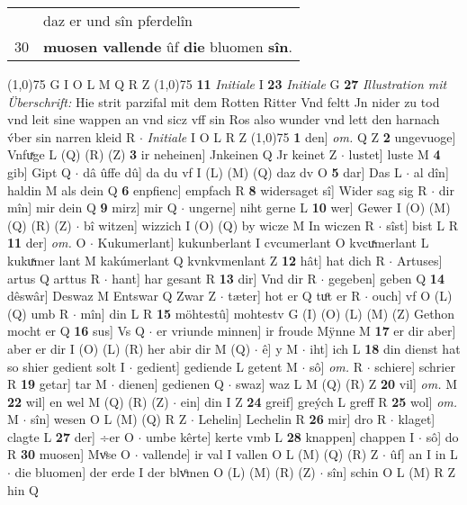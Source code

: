 \documentclass[8pt,a4paper,notitlepage]{article}
\begin{document}
\begin{table}[ht]
\begin{minipage}[t]{0.5\linewidth}
\begin{tabular}{rl}
 & daz er und sîn pferdelîn\\ 
30 & \textbf{muosen vallende} ûf \textbf{die} bluomen \textbf{sîn}.\\ 
\end{tabular}
\scriptsize
\line(1,0){75} \newline
G I O L M Q R Z \newline
\line(1,0){75} \newline
\textbf{11} \textit{Initiale} I  \textbf{23} \textit{Initiale} G  \textbf{27} \textit{Illustration mit Überschrift:} Hie strit parzifal mit dem Rotten Ritter Vnd feltt Jn nider zu tod vnd leit sine wappen an vnd sicz vff sin Ros also wunder vnd lett den harnach v́ber sin narren kleid R   $\cdot$ \textit{Initiale} I O L R Z  \newline
\line(1,0){75} \newline
\textbf{1} den] \textit{om.} Q Z \textbf{2} ungevuoge] Vnfuͯge L (Q) (R) (Z) \textbf{3} ir neheinen] Jnkeinen Q Jr keinet Z  $\cdot$ lustet] luste M \textbf{4} gib] Gipt Q  $\cdot$ dâ ûffe dû] da du vf I (L) (M) (Q) daz dv O \textbf{5} dar] Das L  $\cdot$ al dîn] haldin M als dein Q \textbf{6} enpfienc] empfach R \textbf{8} widersaget sî] Wider sag sig R  $\cdot$ dir mîn] mir dein Q \textbf{9} mirz] mir Q  $\cdot$ ungerne] niht gerne L \textbf{10} wer] Gewer I (O) (M) (Q) (R) (Z)  $\cdot$ bî witzen] wizzich I (O) (Q) by wicze M In wiczen R  $\cdot$ sîst] bist L R \textbf{11} der] \textit{om.} O  $\cdot$ Kukumerlant] kukunberlant I cvcumerlant O kvcuͯmerlant L kukuͯmer lant M kakúmerlant Q kvnkvmenlant Z \textbf{12} hât] hat dich R  $\cdot$ Artuses] artus Q arttus R  $\cdot$ hant] har gesant R \textbf{13} dir] Vnd dir R  $\cdot$ gegeben] geben Q \textbf{14} dêswâr] Deswaz M Entswar Q Zwar Z  $\cdot$ tæter] hot er Q tuͦt er R  $\cdot$ ouch] vf O (L) (Q) umb R  $\cdot$ mîn] din L R \textbf{15} möhtestû] mohtestv G (I) (O) (L) (M) (Z) Gethon mocht er Q \textbf{16} sus] Vs Q  $\cdot$ er vriunde minnen] ir froude Mÿnne M \textbf{17} er dir aber] aber er dir I (O) (L) (R) her abir dir M (Q)  $\cdot$ ê] y M  $\cdot$ iht] ich L \textbf{18} din dienst hat so shier gedient solt I  $\cdot$ gedient] gediende L getent M  $\cdot$ sô] \textit{om.} R  $\cdot$ schiere] schrier R \textbf{19} getar] tar M  $\cdot$ dienen] gedienen Q  $\cdot$ swaz] waz L M (Q) (R) Z \textbf{20} vil] \textit{om.} M \textbf{22} wil] en wel M (Q) (R) (Z)  $\cdot$ ein] din I Z \textbf{24} greif] greých L greff R \textbf{25} wol] \textit{om.} M  $\cdot$ sîn] wesen O L (M) (Q) R Z  $\cdot$ Lehelin] Lechelin R \textbf{26} mir] dro R  $\cdot$ klaget] clagte L \textbf{27} der] ÷er O  $\cdot$ umbe kêrte] kerte vmb L \textbf{28} knappen] chappen I  $\cdot$ sô] do R \textbf{30} muosen] Mvͦse O  $\cdot$ vallende] ir val I vallen O L (M) (Q) (R) Z  $\cdot$ ûf] an I in L  $\cdot$ die bluomen] der erde I der blvͦmen O (L) (M) (R) (Z)  $\cdot$ sîn] schin O L (M) R Z hin Q \newline

\end{minipage}
\end{table}
\end{document}
